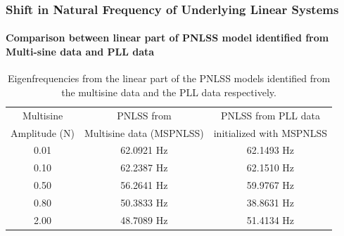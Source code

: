 \documentclass[aspectratio=169]{beamer}
\begin{document}
\begin{frame}
  \frametitle{Shift in Natural Frequency of Underlying Linear Systems}
  \framesubtitle{Comparison between linear part of PNLSS model
    identified from Multi-sine data and PLL data} 

  \begin{table}[!h]
    \centering
    \begin{tabular}{ccc}
      \hline\hline
      Multisine & PNLSS from & PNLSS from PLL data\\
      Amplitude (N) & Multisine data (MSPNLSS) & initialized with MSPNLSS \\
      \hline
      0.01 & 62.0921 Hz & 62.1493 Hz \\
      0.10 & 62.2387 Hz & 62.1510 Hz \\
      0.50 & 56.2641 Hz & 59.9767 Hz \\
      0.80 & 50.3833 Hz & 38.8631 Hz \\
      2.00 & 48.7089 Hz & 51.4134 Hz \\\hline\hline
    \end{tabular}
    \caption{Eigenfrequencies from the linear part of the PNLSS models
    identified from the multisine data and the PLL data respectively.}
    \label{tab:table}
  \end{table}
\end{frame}
\end{document}
